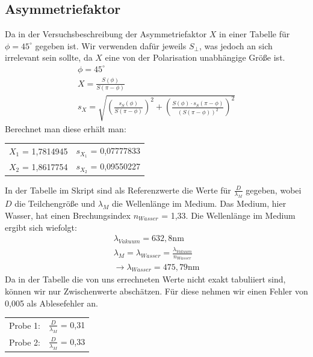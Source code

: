 \subsection*{Asymmetriefaktor}

Da in der Versuchsbeschreibung der Asymmetriefaktor $X$ in einer Tabelle für $\phi = 45^{\circ}$ gegeben ist. Wir verwenden dafür jeweils $S_{\perp}$, was jedoch an sich irrelevant sein sollte, 
da $X$ eine von der Polarisation unabhängige Größe ist.
\begin{gather*}
    \phi = 45^{\circ}\\
    X = \frac{S(\phi)}{S(\pi - \phi)}\\
    s_X = \sqrt{(\frac{s_S (\phi)}{S(\pi-\phi)})^2+(\frac{S(\phi) \cdot s_S (\pi-\phi)}{(S(\pi-\phi))^2})^2}
\end{gather*}
Berechnet man diese erhält man:\\
\begin{center}
    \begin{tabular}{cc}
        $X_1$ = 1,7814945 & $s_{X_{1}}$ = 0,07777833\\
        $X_2$ = 1,8617754 & $s_{X_{2}}$ = 0,09550227\\
    \end{tabular}
\end{center}
\begin{center}
\end{center}
In der Tabelle im Skript sind als Referenzwerte die Werte für $\frac{D}{\lambda_M}$ gegeben, wobei 
$D$ die Teilchengröße und $\lambda_M$ die Wellenlänge im Medium. Das Medium, hier Wasser, hat einen Brechungsindex 
$n_{Wasser}$ = 1,33. 
Die Wellenlänge im Medium ergibt sich wiefolgt:
\begin{gather*}
    \lambda_{Vakuum} = 632,8 \mathrm{nm} \\
    \lambda_M = \lambda_{Wasser} = \frac{\lambda_{Vakuum}}{n_{Wasser}}\\
    \rightarrow \lambda_{Wasser} = 475,79\mathrm{nm}
\end{gather*}
Da in der Tabelle die von uns errechneten Werte nicht exakt tabuliiert sind, können wir nur Zwischenwerte abschätzen. Für diese nehmen wir einen Fehler von 0,005 als Ablesefehler an. 
\begin{center}
    \begin{tabular}{cc}
        Probe 1: & $\frac{D}{\lambda_M}$ = 0,31\\
        Probe 2: & $\frac{D}{\lambda_M}$ = 0,33\\
    \end{tabular}
\end{center}
